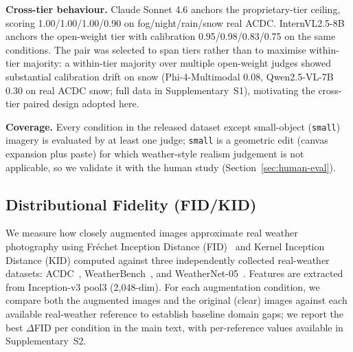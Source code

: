 \documentclass[12pt]{article}
\begin{document}
\textbf{Cross-tier behaviour.} Claude Sonnet 4.6 anchors the proprietary-tier ceiling, scoring 1.00/1.00/1.00/0.90 on fog/night/rain/snow real ACDC. InternVL2.5-8B anchors the open-weight tier with calibration 0.95/0.98/0.83/0.75 on the same conditions. The pair was selected to span tiers rather than to maximise within-tier majority: a within-tier majority over multiple open-weight judges showed substantial calibration drift on snow (Phi-4-Multimodal 0.08, Qwen2.5-VL-7B 0.30 on real ACDC snow; full data in Supplementary~S1), motivating the cross-tier paired design adopted here.

\textbf{Coverage.} Every condition in the released dataset except small-object (\texttt{small}) imagery is evaluated by at least one judge; \texttt{small} is a geometric edit (canvas expansion plus paste) for which weather-style realism judgement is not applicable, so we validate it with the human study (Section~\ref{sec:human-eval}).

\subsection{Distributional Fidelity (FID/KID)}
\label{sec:fid-kid}

We measure how closely augmented images approximate real weather photography using Fr\'{e}chet Inception Distance (FID)~\citep{heusel2017fid} and Kernel Inception Distance (KID) computed against three independently collected real-weather datasets: ACDC~\citep{sakaridis2021acdc}, WeatherBench~\citep{weatherbench2025}, and WeatherNet-05~\citep{weathernet05}. Features are extracted from Inception-v3 pool3 (2,048-dim). For each augmentation condition, we compare both the augmented images and the original (clear) images against each available real-weather reference to establish baseline domain gaps; we report the best $\Delta$FID per condition in the main text, with per-reference values available in Supplementary~S2.
\end{document}
